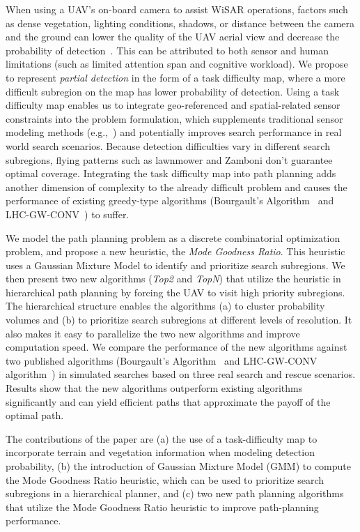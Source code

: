 \documentclass[journal]{IEEEtran}
\begin{document}
When using a UAV's on-board camera to assist WiSAR operations, factors such as dense vegetation, lighting conditions, shadows, or distance between the camera and the ground can lower the quality of the UAV aerial view and decrease the probability of detection~\cite{morse2010uav}. This can be attributed to both sensor and human limitations (such as limited attention span and cognitive workload). We propose to represent \textit{partial detection} in the form of a task difficulty map, where a more difficult subregion on the map has lower probability of detection. Using a task difficulty map enables us to integrate geo-referenced and spatial-related sensor constraints into the problem formulation, which supplements traditional sensor modeling methods (e.g.,~\cite{Bourgault2006}) and potentially improves search performance in real world search scenarios. Because detection difficulties vary in different search subregions, flying patterns such as lawnmower and Zamboni don't guarantee optimal coverage. Integrating the task difficulty map into path planning adds another dimension of complexity to the already difficult problem and causes the performance of existing greedy-type algorithms (Bourgault's Algorithm~\cite{Bourgault2006} and LHC-GW-CONV~\cite{lin2009uav}) to suffer.

We model the path planning problem as a discrete combinatorial optimization problem, and propose a new heuristic, the \textit{Mode Goodness Ratio}. This heuristic uses a Gaussian Mixture Model to identify and prioritize search subregions. We then present two new algorithms (\textit{Top2} and \textit{TopN}) that utilize the heuristic in hierarchical path planning by forcing the UAV to visit high priority subregions. The hierarchical structure enables the algorithms (a) to cluster probability volumes and (b) to prioritize search subregions at different levels of resolution. It also makes it easy to parallelize the two new algorithms and improve computation speed. We compare the performance of the new algorithms against two published algorithms (Bourgault's Algorithm~\cite{Bourgault2006} and LHC-GW-CONV algorithm~\cite{lin2009uav}) in simulated searches based on three real search and rescue scenarios. Results show that the new algorithms outperform existing algorithms significantly and can yield efficient paths that approximate the payoff of the optimal path.

The contributions of the paper are (a) the use of a task-difficulty map to incorporate terrain and vegetation information when modeling detection probability, (b) the introduction of Gaussian Mixture Model (GMM) to compute the Mode Goodness Ratio heuristic, which can be used to prioritize search subregions in a hierarchical planner, and (c) two new path planning algorithms that utilize the Mode Goodness Ratio heuristic to improve path-planning performance.
\end{document}
